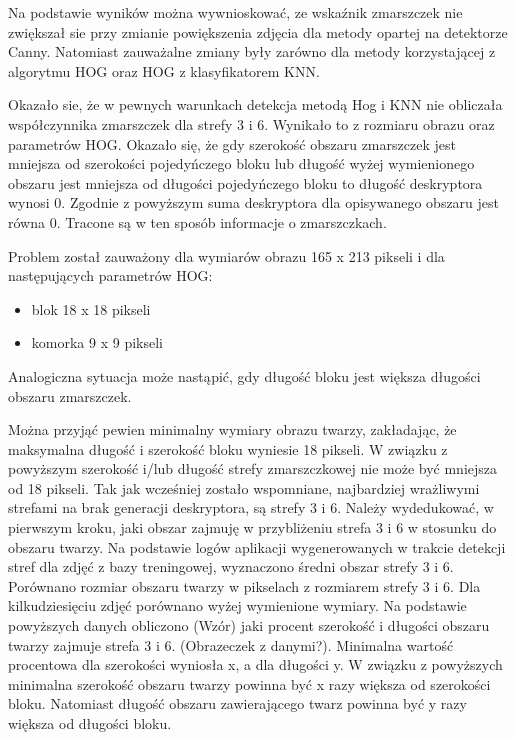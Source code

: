 \documentclass[a4paper,twoside,12pt]{book}
\begin{document}
    Na podstawie wyników można wywnioskować, ze wskaźnik zmarszczek nie zwiększał sie przy zmianie
    powiększenia zdjęcia dla metody opartej na detektorze Canny. Natomiast zauważalne zmiany były zarówno dla metody
    korzystającej z algorytmu HOG oraz HOG z klasyfikatorem KNN.

    Okazało sie, że w pewnych warunkach detekcja metodą Hog i KNN nie obliczała współczynnika zmarszczek dla strefy 3
    i 6.
    Wynikało to z rozmiaru obrazu oraz parametrów HOG.
    Okazało się, że gdy szerokość obszaru zmarszczek jest mniejsza od szerokości pojedyńczego bloku lub długość wyżej
    wymienionego obszaru jest mniejsza od długości pojedyńczego bloku
    to długość deskryptora wynosi 0. Zgodnie z powyższym suma deskryptora dla opisywanego obszaru jest równa 0.
    Tracone są w ten sposób informacje o zmarszczkach.

    Problem został zauważony dla wymiarów obrazu 165 x 213 pikseli i dla następujących parametrów HOG:
    \begin{itemize}
        \item blok 18 x 18 pikseli
        \item komorka 9 x 9 pikseli
    \end{itemize}
    Analogiczna sytuacja może nastąpić, gdy długość bloku jest większa długości obszaru zmarszczek.

    Można przyjąć pewien minimalny wymiary obrazu twarzy, zakładając, że maksymalna długość i szerokość bloku wyniesie 18 pikseli.
    W związku z powyższym szerokość i/lub długość strefy zmarszczkowej nie może być mniejsza od 18 pikseli.
    Tak jak wcześniej zostało wspomniane, najbardziej wrażliwymi strefami na brak generacji deskryptora, są strefy 3
    i 6.
    Należy wydedukować, w pierwszym kroku, jaki obszar zajmuję w przybliżeniu strefa 3 i 6 w stosunku do obszaru twarzy.
    Na podstawie logów aplikacji wygenerowanych w trakcie detekcji stref dla zdjęć z bazy treningowej, wyznaczono
    średni obszar strefy 3 i 6. Porównano rozmiar obszaru twarzy w pikselach z rozmiarem strefy 3 i 6.
    Dla kilkudziesięciu zdjęć porównano wyżej wymienione wymiary. Na podstawie powyższych danych obliczono (Wzór) jaki
    procent
    szerokość i długości obszaru twarzy zajmuje strefa 3 i 6. (Obrazeczek z danymi?).
    Minimalna wartość procentowa dla szerokości wyniosła x, a dla długości y. W związku z powyższych minimalna
    szerokość obszaru twarzy powinna być x razy większa od szerokości bloku.
    Natomiast długość obszaru zawierającego twarz powinna być y razy większa od długości bloku.
\end{document}
